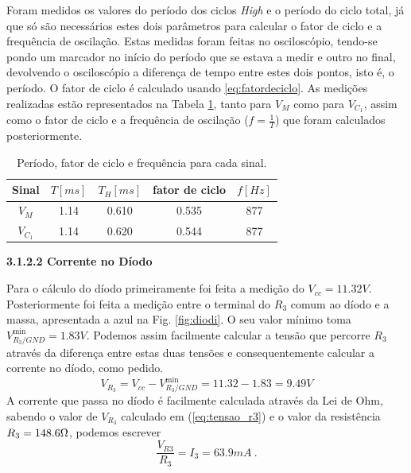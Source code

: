 Foram medidos os valores do período dos ciclos \textit{High} e o período do ciclo total, já que só são necessários estes dois parâmetros para calcular o fator de ciclo e a frequência de oscilação. Estas medidas foram feitas no osciloscópio, tendo-se pondo um marcador no início do período que se estava a medir e outro no final, devolvendo o osciloscópio a diferença de tempo entre estes dois pontos, isto é, o período.  O fator de ciclo é calculado usando \eqref{eq:fatordeciclo}. As medições realizadas estão representados na Tabela \ref{tab:períodos_tabela}, tanto para $V_M$ como para $V_{C_1}$, assim como o fator de ciclo e a frequência de oscilação ($f=\frac{1}{T}$) que foram calculados posteriormente. 
\begin{table}[ht]
    \centering
    \caption{Período, fator de ciclo e frequência para cada sinal.}
    \begin{tabular}{ccccc}
    \hline
         Sinal & $T [ms]$ & $T_{H} [ms]$ & fator de ciclo & $f [Hz]$\\
        \hline
        $V_M$   & 1.14 & 0.610 &    0.535 & 877\\
         $V_{C_1}$   & 1.14 & 0.620 &  0.544  & 877\\
    \hline
    \end{tabular}
    \label{tab:períodos_tabela}
\end{table}

\vspace{2mm}
\noindent\textbf{3.1.2.2 \hspace{1mm}Corrente no Díodo} \par
Para o cálculo do díodo primeiramente foi feita a medição do $V_{cc}=11.32 V$. Posteriormente foi feita a medição entre o terminal do $R_3$ comum ao díodo e a massa, apresentada a azul na Fig. \ref{fig:diodi}. O seu valor mínimo toma $V^{\mathrm{min}}_{R_3/GND}=1.83V$. Podemos assim facilmente calcular a tensão que percorre $R_3$ através da diferença entre estas duas tensões e consequentemente calcular a corrente no díodo, como pedido.
\begin{equation}
\label{eq:tensao_r3}
    V_{R_3}= V_{cc} -V^{\mathrm{min}}_{R_3/GND} =  11.32 - 1.83 = 9.49 V
\end{equation}
A corrente que passa no díodo é facilmente calculada através da Lei de Ohm, sabendo o valor de $V_{R_3}$ calculado em (\ref{eq:tensao_r3}) e o valor da resistência $R_3=148.6 \ohm$, podemos escrever
\begin{equation*}
    \frac{V_{R3}}{R_3} = I_3 = 63.9 mA \: .
\end{equation*}



